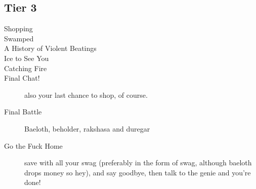 \documentclass[10pt,a4,twoside]{article}
\begin{document}
\begin{titlepage}
\section*{Tier 3}
\begin{description}
 \item[Shopping]
 \item[Swamped]
 \item[A History of Violent Beatings]
 \item[Ice to See You]
 \item[Catching Fire]
 \item[Final Chat!] also your last chance to shop, of course.
 \item[Final Battle] Baeloth, beholder, rakshasa and duregar
 \item[Go the Fuck Home] save with all your swag (preferably in the form of swag, although baeloth drops money so hey), and say goodbye, then talk to the genie and you're done!
\end{description}

\end{titlepage}

\end{document}
